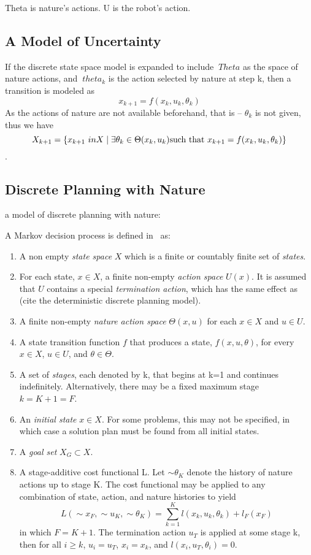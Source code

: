 Theta is nature's actions. U is the robot's action.

\subsection{A Model of Uncertainty}

If the discrete state space model is expanded to include \(\ Theta\) as the
space of nature actions, and \(\ theta_k\) is the action selected by nature at
step k, then a transition is modeled as
\[
  x_{k+1} = f(x_k,u_k,\theta_k)
\]
As the actions of nature are not available beforehand, that is -- \(\theta_ k\)
is not given, thus we have
\[
  X_{k+1} = \lbrace x_{k+1} \ in X \mid \exists\theta_k \in \Theta(x_k,u_k)
    \text{such that } x_{k+1} = f(x_k,u_k,\theta_k)\rbrace
\]\cite{Lav06}.

\subsection{Discrete Planning with Nature}
a model of discrete planning with nature:~\cite[pg,496]{Lav06}

A Markov decision process is defined in~\cite[pg.498]{Lav06} as:
\begin{enumerate}
\item A non empty \textit{state space} \(X\) which is a finite or countably
  finite set of \textit{states}.
\item For each state, \(x \in X\), a finite non-empty \textit{action space}
  \(U(x)\). It is assumed that \(U\) contains a special \textit{termination
    action}, which has the same effect as (cite the deterministic discrete
  planning model).
\item A finite non-empty \textit{nature action space} \(\Theta(x,u)\) for each
  \(x \in X\) and \(u \in U\).
\item A state transition function \(f\) that produces a state,
  \(f(x,u,\theta)\), for every \(x \in X\), \(u \in U\), and \(\theta \in
  \Theta\).
\item A set of \textit{stages}, each denoted by k, that begins at k=1 and
  continues indefinitely. Alternatively, there may be a fixed maximum stage \(k
  = K+1=F\).
\item An \textit{initial state} \(x \in X\). For some problems, this may not be
  specified, in which case a solution plan must be found from all initial
  states.

\item A \textit{goal set} \(X_G \subset X\).
\item A stage-additive cost functional L. Let \(\sim{\theta}_K\) denote the
  history of nature actions up to stage K. The cost functional may be applied to
  any combination of state, action, and nature histories to yield
  \[
    L(\sim{x}_F, \sim{u}_K, \sim{\theta}_K) = \sum_{k=1}^{K} l(x_k,u_k,\theta_k)
    + l_F(x_F)
  \]
  in which \(F = K + 1\). The termination action \(u_T\) is applied at some
  stage k, then for all \(i \geq k\), \(u_i = u_T\), \(x_i = x_k\), and
  \(l(x_i,u_T, \theta_i) = 0\).
\end{enumerate}~\cite[pg 498]{Lav06}

